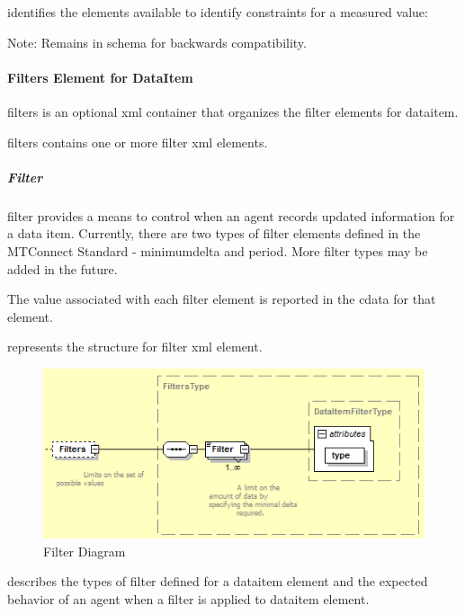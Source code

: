  identifies the elements available to identify \gls{constraints} for a measured value:



\begin{note}
Note: \notesign Remains in schema for backwards compatibility.

\end{note}

\paragraph{Filters Element for DataItem}\mbox{}

\gls{filters} is an optional \gls{xml} container that organizes the \gls{filter} elements for \gls{dataitem}.

\gls{filters} contains one or more \gls{filter} \gls{xml} elements.



\newpage

\subparagraph{Filter} \mbox{}

\gls{filter} provides a means to control when an \gls{agent} records updated information for a data item.  Currently, there are two types of \gls{filter} elements defined in the MTConnect Standard - \gls{minimumdelta} and \gls{period}.   More \gls{filter} types may be added in the future.

The value associated with each \gls{filter} element is reported in the \gls{cdata} for that element.

 represents the structure for \gls{filter} \gls{xml} element.

\begin{figure}[ht]
  \centering
  \includegraphics[width=.75\textwidth]{figures/filter-schema-diagram.png}
  \caption{Filter Diagram}
  \label{fig:filter-schema-diagram}
\end{figure}
\FloatBarrier

 describes the types of \gls{filter} defined for a \gls{dataitem} element and the expected behavior of an \gls{agent} when a \gls{filter} is applied to \gls{dataitem} element.

